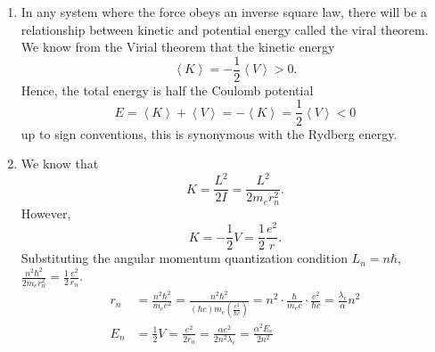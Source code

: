 \begin{sol}
\begin{enumerate}[label=\textbf{(\alph*)}]
    \item In any system where the force obeys an inverse square law, there will be a relationship between kinetic and potential energy called the viral theorem. We know from the Virial theorem that the kinetic energy 
    \[\left<K\right> = -\frac{1}{2}\left<V\right> >0.\]
    Hence, the total energy is half the Coulomb potential 
    \[E = \left<K\right> + \left<V\right> = -\left<K\right> = \frac{1}{2}\left<V\right> < 0\]
    up to sign conventions, this is synonymous with the Rydberg energy.
    \item We know that $$K = \frac{L^2}{2I} = \frac{L^2}{2m_er_n^2}.$$However, $$K = -\frac{1}{2}V = \frac{1}{2}\frac{e^2}{r}.$$ Substituting the angular momentum quantization condition $L_n = n\hbar$, $\frac{n^2\hbar^2}{2m_er_n^2} = \frac{1}{2}\frac{e^2}{r_n}$.
\begin{align*}
    r_n &= \frac{n^2\hbar^2}{m_e e^2} = \frac{n^2\hbar^2}{(\hbar c)m_e(\frac{e^2}{\hbar c})} = n^2 \cdot \frac{\hbar}{m_e c} \cdot \frac{e^2}{\hbar c} = \frac{\lambda_c}{\alpha}n^2 \\
    E_n &= \frac{1}{2}V = \frac{e^2}{2r_n} = \frac{\alpha e^2}{2n^2 \lambda_c} = \frac{\alpha^2E_e}{2n^2}
\end{align*}
\end{enumerate}
\end{sol}